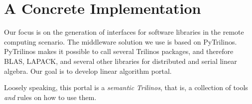 \documentclass[11pt,relax]{SANDreport}
\begin{document}
\section{A Concrete Implementation}

Our focus is on the generation of interfaces for software libraries in the
remote computing scenario. The middleware solution we use is based on
PyTrilinos. PyTrilinos makes it possible to call several Trilinos packages,
  and therefore BLAS, LAPACK, and several other libraries for distributed and
  serial linear algebra. Our goal is to develop linear algorithm portal.

Loosely speaking, this portal is a {\sl semantic Trilinos}, that is, a
collection of tools {\sl and} rules on how to use them.
\end{document}
